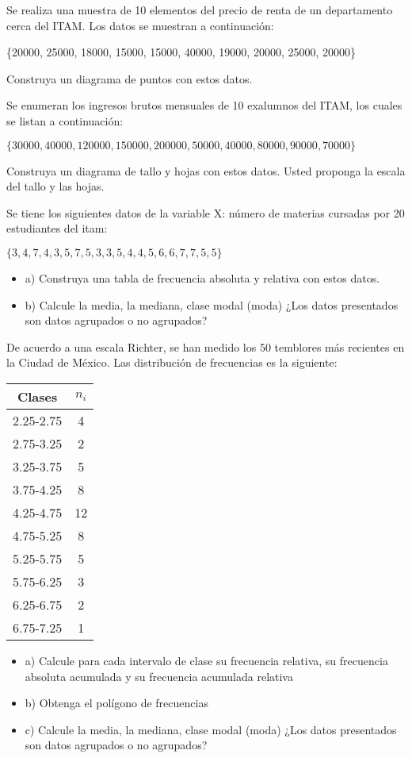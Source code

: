 \documentclass{oxmathproblems}
\begin{document}
\begin{questions}

\miquestion Se realiza una muestra de 10 elementos del precio de renta de un departamento cerca del ITAM. Los datos se muestran a continuación:

\{20000, 25000, 18000, 15000, 15000, 40000, 19000, 20000, 25000, 20000\}

Construya un diagrama de puntos con estos datos.

\miquestion Se enumeran los ingresos brutos mensuales de 10 exalumnos del ITAM, los cuales se listan a continuación:

$\{30000, 40000, 120000, 150000, 200000, 50000, 40000, 80000, 90000, 70000\}$

Construya un diagrama de tallo y hojas con estos datos. Usted proponga la escala del tallo y las hojas.

\miquestion Se tiene los siguientes datos de la variable X: número de materias cursadas por 20 estudiantes del itam:

$\{3,4,7,4,3,5,7,5,3,3,5,4,4,5,6,6,7,7,5,5\}$

\begin{itemize}
\item a) Construya una tabla de frecuencia absoluta y relativa con estos datos.
\item b) Calcule la media, la mediana, clase modal (moda) ¿Los datos presentados son datos agrupados o no agrupados?
\end{itemize}

\miquestion De acuerdo a una escala Richter, se han medido los 50 temblores más recientes en la Ciudad de México. Las distribución de frecuencias es la siguiente:
\begin{center}
\begin{tabular}{ |c|c| } 
 \hline
 \textbf{Clases} & \textbf{$n_i$} \\ 
 \hline
 2.25-2.75 & 4 \\
 2.75-3.25 & 2 \\
 3.25-3.75 & 5\\ 
 3.75-4.25 & 8 \\ 
 4.25-4.75 & 12 \\ 
 4.75-5.25 & 8 \\ 
 5.25-5.75 & 5 \\ 
 5.75-6.25 & 3 \\ 
 6.25-6.75 & 2 \\ 
 6.75-7.25 & 1 \\ 
 \hline
\end{tabular}
\end{center}

\begin{itemize}
\item a) Calcule para cada intervalo de clase su frecuencia relativa, su frecuencia absoluta acumulada y su frecuencia acumulada relativa
\item b) Obtenga el polígono de frecuencias
\item c) Calcule la media, la mediana, clase modal (moda) ¿Los datos presentados son datos agrupados o no agrupados?
\end{itemize}

\end{questions}
\end{document}
